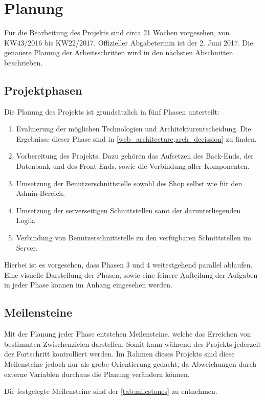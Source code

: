 \section{Planung} \thispagestyle{nomarkstyle}
Für die Bearbeitung des Projekts sind circa 21 Wochen vorgesehen, von KW43/2016 bis KW22/2017. Offizieller Abgabetermin ist der 2. Juni 2017. Die genauere Planung der Arbeitsschritten wird in den nächsten Abschnitten beschrieben.

\subsection{Projektphasen}
Die Planung des Projekts ist grundsätzlich in fünf Phasen unterteilt:
\begin{enumerate}
	\item Evaluierung der möglichen Technologien und Architekturentscheidung. Die Ergebnisse dieser Phase sind in \cref{web_architecture,arch_decission} zu finden.
	\item Vorbereitung des Projekts. Dazu gehören das Aufsetzen des Back-Ends, der Datenbank und des Front-Ends, sowie die Verbindung aller Komponenten.
	\item Umsetzung der  Benutzerschnittstelle sowohl des Shop selbst wie für den Admin-Bereich.
	\item Umsetzung der serverseitigen Schnittstellen samt der darunterliegenden Logik.
	\item Verbindung von Benutzerschnittstelle zu den verfügbaren Schnittstellen im Server.
\end{enumerate}

Hierbei ist es vorgesehen, dass Phasen 3 und 4 weitestgehend parallel ablaufen. Eine visuelle Darstellung der Phasen, sowie eine feinere Aufteilung der Aufgaben in jeder Phase können im Anhang eingesehen werden. %

\subsection{Meilensteine}
Mit der Planung jeder Phase entstehen Meilensteine, welche das Erreichen von bestimmten Zwischenzielen darstellen. Somit kann während des Projekts jederzeit der Fortschritt kontrolliert werden. Im Rahmen dieses Projekts sind diese Meilensteine jedoch nur als grobe Orientierung gedacht, da Abweichungen durch externe Variablen durchaus die Planung verändern können.

Die festgelegte Meilensteine sind der \cref{tab:milestones} zu entnehmen.

